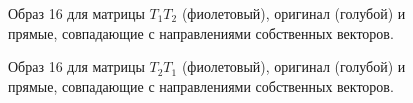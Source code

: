 \documentclass[a5paper, 10pt]{article}
\theoremstyle{definition}
\theoremstyle{plain}
\theoremstyle{remark}
\begin{document}
\newpage
\begin{figure}[h!]
\caption{Образ 16 для матрицы $T_1 T_2$ (фиолетовый), оригинал (голубой) и прямые, совпадающие с направлениями собственных векторов.}
\end{figure}

\newpage
\begin{figure}[h!]
\caption{Образ 16 для матрицы $T_2 T_1$ (фиолетовый), оригинал (голубой) и прямые, совпадающие с направлениями собственных векторов.}
\end{figure}
\end{document}

